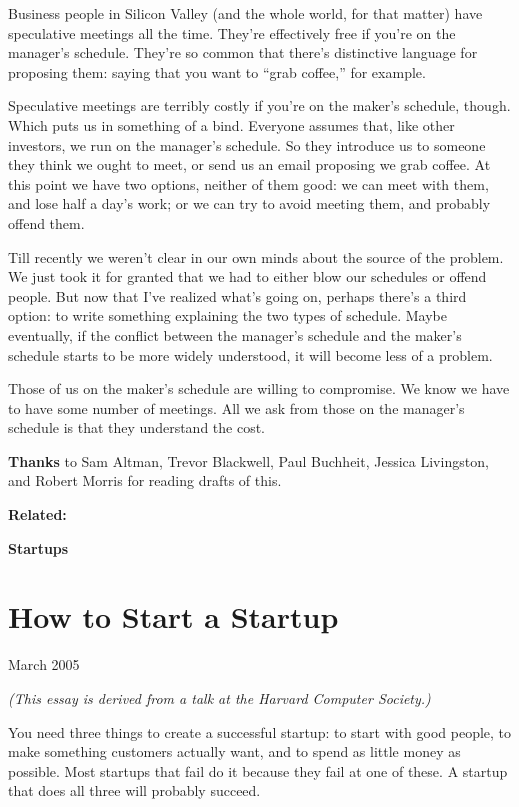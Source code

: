 \documentclass[12pt]{book}
\begin{document}
Business people in Silicon Valley (and the whole world, for that matter)
have speculative meetings all the time. They're effectively free if
you're on the manager's schedule. They're so common that there's
distinctive language for proposing them: saying that you want to ``grab
coffee,'' for example.

Speculative meetings are terribly costly if you're on the maker's
schedule, though. Which puts us in something of a bind. Everyone assumes
that, like other investors, we run on the manager's schedule. So they
introduce us to someone they think we ought to meet, or send us an email
proposing we grab coffee. At this point we have two options, neither of
them good: we can meet with them, and lose half a day's work; or we can
try to avoid meeting them, and probably offend them.

Till recently we weren't clear in our own minds about the source of the
problem. We just took it for granted that we had to either blow our
schedules or offend people. But now that I've realized what's going on,
perhaps there's a third option: to write something explaining the two
types of schedule. Maybe eventually, if the conflict between the
manager's schedule and the maker's schedule starts to be more widely
understood, it will become less of a problem.

Those of us on the maker's schedule are willing to compromise. We know
we have to have some number of meetings. All we ask from those on the
manager's schedule is that they understand the cost.

\textbf{Thanks} to Sam Altman, Trevor Blackwell, Paul Buchheit, Jessica
Livingston, and Robert Morris for reading drafts of this.

\textbf{Related:}

\clearpage
\thispagestyle{empty}
\vspace*{\fill}
\begin{center}
{\LARGE\bfseries Startups}
\end{center}
\vspace*{\fill}
\clearpage

\chapter{How to Start a Startup}

March 2005

\emph{(This essay is derived from a talk at the Harvard Computer
Society.)}

You need three things to create a successful startup: to start with good
people, to make something customers actually want, and to spend as
little money as possible. Most startups that fail do it because they
fail at one of these. A startup that does all three will probably
succeed.
\end{document}
